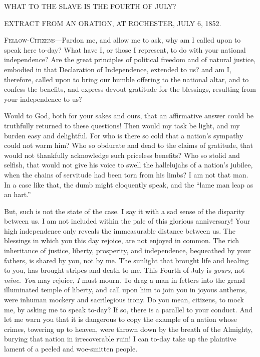{WHAT TO THE SLAVE IS THE FOURTH OF JULY?}

{EXTRACT FROM AN ORATION, AT ROCHESTER, JULY 6, 1852.}

\textsc{Fellow-Citizens}---Pardon me, and allow me to ask, why am I
called upon to speak here to-day? What have I, or those I represent, to
do with your national independence? Are the great principles of
political freedom and of natural justice, embodied in that Declaration
of Independence, extended to us? and am I, therefore, called upon to
bring our humble offering to the national altar, and to confess the
benefits, and express devout gratitude for the blessings, resulting from
your independence to us?

Would to God, both for your sakes and ours, that an affirmative answer
could be truthfully returned to these questions! Then would my task be
light, and my burden easy and delightful. For who is there so cold that
a nation's sympathy could not warm him? Who so obdurate and dead to the
claims of gratitude, that would not thankfully acknowledge such
priceless benefits? Who so stolid and selfish, that would not give his
voice to swell the hallelujahs of a nation's jubilee, when the chains of
servitude had been torn from his limbs? I am not that man. In a case
like that, the dumb might eloquently speak, and the ``lame man leap as
an hart.''

But, such is not the state of the case. I say it with a sad sense of the
disparity between us. I am not included within the pale of this glorious
anniversary! Your high independence only reveals the immeasurable
distance between us. The blessings in which you this day rejoice, are
not enjoyed in common. The rich inheritance of justice, liberty,
prosperity, and independence, bequeathed by your fathers, is shared by
you, not by me. The sunlight that brought life and healing to you, has
brought stripes and death to me. This Fourth of July is \emph{yours},
not \emph{mine}. \emph{You} may rejoice, \emph{I} must mourn. To drag a
man in fetters into the grand illuminated temple of liberty, and call
upon him to join you in joyous anthems, were inhuman mockery and
sacrilegious irony. Do you mean, {}citizens, to mock me, by asking me to
speak to-day? If so, there is a parallel to your conduct. And let me
warn you that it is dangerous to copy the example of a nation whose
crimes, towering up to heaven, were thrown down by the breath of the
Almighty, burying that nation in irrecoverable ruin! I can to-day take
up the plaintive lament of a peeled and woe-smitten people.

